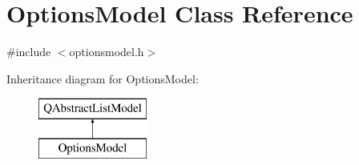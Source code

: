 \hypertarget{class_options_model}{}\section{Options\+Model Class Reference}
\label{class_options_model}


{\ttfamily \#include $<$optionsmodel.\+h$>$}

Inheritance diagram for Options\+Model\+:\begin{figure}[H]
\begin{center}
\leavevmode
\includegraphics[height=2.000000cm]{class_options_model}
\end{center}
\end{figure}
